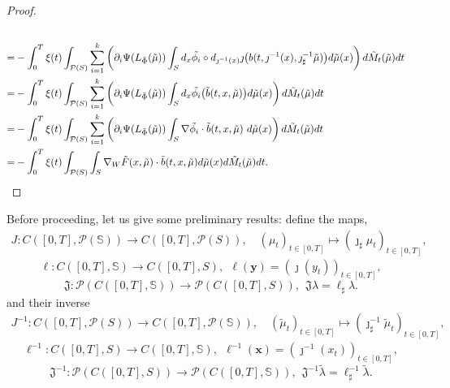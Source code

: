 \documentclass[10pt,leqno]{amsart}
\numberwithin{equation}{section}
\newcommand{\PP}{\mathcal{P}}
\newcommand{\Ss}{\mathbb{S}}
\begin{document}
\begin{proof}
\begin{align*}
    \\
    = & 
    -\int_0^T \xi(t) \int_{\PP(S)} \sum_{i=1}^k \left(\partial_i \Psi (L_{\tilde{\Phi}}(\tilde{\mu}))\int_{S} d_{x}\Tilde{\phi_i}\circ d_{\jmath^{-1}(x)}\jmath\big(b(t,\jmath^{-1}(x),\jmath^{-1}_\sharp\tilde{\mu})\big) d\tilde\mu(x) \right) d\tilde{M}_t(\tilde{\mu}) dt
    \\
    = & 
    -\int_0^T \xi(t) \int_{\PP(S)} \sum_{i=1}^k \left(\partial_i \Psi (L_{\tilde{\Phi}}(\tilde{\mu}))\int_{S} d_{x}\Tilde{\phi_i}\big(\Tilde{b}(t,x,\tilde{\mu})\big) d\tilde{\mu}(x) \right) d\tilde{M}_t(\tilde{\mu}) dt
    \\
    = & 
    -\int_0^T \xi(t) \int_{\PP(S)} \sum_{i=1}^k \left(\partial_i \Psi (L_{\tilde{\Phi}}(\tilde{\mu}))\int_{S} \nabla\Tilde{\phi_i}\cdot \Tilde{b}(t,x,\tilde{\mu})\ d\tilde{\mu}(x) \right) d\tilde{M}_t(\tilde{\mu}) dt
    \\
    = & 
    -\int_0^T \xi(t) \int_{\PP(S)} \int_{S} \nabla_W \tilde{F}(x,\tilde{\mu}) \cdot \Tilde{b}(t,x,\tilde{\mu}) d\tilde{\mu}(x) d\tilde{M}_t(\tilde{\mu}) dt.
\end{align*}
\end{proof}

\normalcolor


Before proceeding, let us give some preliminary results: define the maps,
\begin{equation*}%
\begin{aligned}
     J:C([0,T],\PP(\Ss))  \to C([0,T],\PP(S)),
     \quad 
     (\mu_t)_{t\in [0,T]}  \mapsto (\jmath_\sharp\mu_t)_{t\in [0,T]},
\end{aligned}
\end{equation*}
\begin{equation}\label{eq: ell direct}
    \ell:C([0,T],\Ss) \to C([0,T],S), \ \  \ell(\boldsymbol{y}) = (\jmath(y_t))_{t\in [0,T]},
\end{equation}
\begin{equation*}%
    \mathfrak{J}:\PP(C([0,T],\Ss)) \to \PP(C([0,T],S)), \ \ 
    \mathfrak{J}\lambda = \ell_\sharp \lambda.
\end{equation*}
and their inverse
\begin{equation*}%
\begin{aligned}
     J^{-1}:C([0,T],\PP(S))  \to C([0,T],\PP(\Ss)),
     \quad 
     (\tilde\mu_t)_{t\in [0,T]}  \mapsto (\jmath^{-1}_\sharp\tilde\mu_t)_{t\in [0,T]},
\end{aligned}
\end{equation*}
\begin{equation}\label{eq: ell}
    \ell^{-1}:C([0,T],S) \to C([0,T],\Ss), \ \  \ell^{-1}(\boldsymbol{x}) = (\jmath^{-1}(x_t))_{t\in [0,T]},
\end{equation}
\begin{equation*}%
    \mathfrak{J}^{-1}:\PP(C([0,T],S)) \to \PP(C([0,T],\Ss)), \ \ 
    \mathfrak{J}^{-1}\tilde\lambda = \ell^{-1}_\sharp \tilde\lambda.
\end{equation*}
\end{document}
